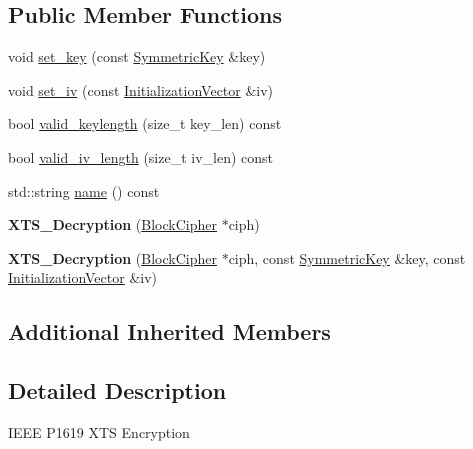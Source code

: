 \subsection*{Public Member Functions}
\begin{DoxyCompactItemize}
\item 
void \hyperlink{classBotan_1_1XTS__Decryption_a036a2792616de0aee61b4171716254e7}{set\-\_\-key} (const \hyperlink{namespaceBotan_a00c78597211d5c63b63e2a57ddb96d38}{Symmetric\-Key} \&key)
\item 
void \hyperlink{classBotan_1_1XTS__Decryption_a5084f42d80fde8bf345ba7e243f626c1}{set\-\_\-iv} (const \hyperlink{namespaceBotan_ab6a07e859c4e3a2ccfd68308ec89497e}{Initialization\-Vector} \&iv)
\item 
bool \hyperlink{classBotan_1_1XTS__Decryption_a72ef64b8e4c3fe4061de285d53bcb238}{valid\-\_\-keylength} (size\-\_\-t key\-\_\-len) const 
\item 
bool \hyperlink{classBotan_1_1XTS__Decryption_a40b46dca7e4fe10df8688387ee5a2920}{valid\-\_\-iv\-\_\-length} (size\-\_\-t iv\-\_\-len) const 
\item 
std\-::string \hyperlink{classBotan_1_1XTS__Decryption_a3b7149a7ec50bfadb48e4d930ac28956}{name} () const 
\item 
\hypertarget{classBotan_1_1XTS__Decryption_a9671e7c4275a9e49838ca826401109e4}{{\bfseries X\-T\-S\-\_\-\-Decryption} (\hyperlink{classBotan_1_1BlockCipher}{Block\-Cipher} $\ast$ciph)}\label{classBotan_1_1XTS__Decryption_a9671e7c4275a9e49838ca826401109e4}

\item 
\hypertarget{classBotan_1_1XTS__Decryption_a3df93e9c604c0d8c28a7a457d87e6c7a}{{\bfseries X\-T\-S\-\_\-\-Decryption} (\hyperlink{classBotan_1_1BlockCipher}{Block\-Cipher} $\ast$ciph, const \hyperlink{namespaceBotan_a00c78597211d5c63b63e2a57ddb96d38}{Symmetric\-Key} \&key, const \hyperlink{namespaceBotan_ab6a07e859c4e3a2ccfd68308ec89497e}{Initialization\-Vector} \&iv)}\label{classBotan_1_1XTS__Decryption_a3df93e9c604c0d8c28a7a457d87e6c7a}

\end{DoxyCompactItemize}
\subsection*{Additional Inherited Members}


\subsection{Detailed Description}
I\-E\-E\-E P1619 X\-T\-S Encryption 

